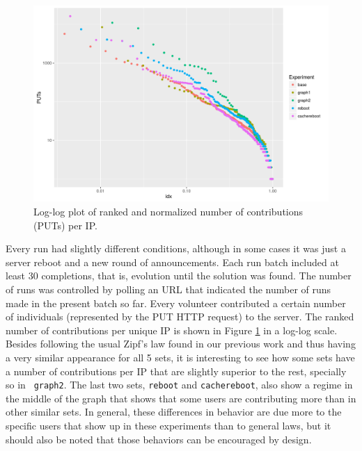 \documentclass[runningheads,a4paper]{llncs}\usepackage[]{graphicx}\usepackage[]{color}
\makeatletter
\def\maxwidth{ %
  \ifdim\Gin@nat@width>\linewidth
    \linewidth
  \else
    \Gin@nat@width
  \fi
}
\newenvironment{knitrout}{}{} %
\makeatother
\begin{document}
%
%
\begin{figure}[htbp]
\centering
\begin{knitrout}
\color{fgcolor}
\includegraphics[width=\maxwidth]{figure/zipf-1} 

\end{knitrout}
%
\caption{Log-log plot of ranked and normalized number of contributions (PUTs) per IP.\label{fig:zipf}}
\end{figure}
%
Every run had slightly different conditions, although in some cases it
was just a server reboot and a new round of announcements. Each run
batch included at least 30 completions, that is, evolution until the
solution was found. The number of runs was controlled by polling an
URL that indicated the number of runs made in the present batch so
far. Every volunteer contributed a certain number of individuals
(represented by the PUT HTTP request) to the server. The ranked number
of contributions per unique IP is shown in Figure \ref{fig:zipf} in a
log-log scale. Besides following the usual Zipf's law found in our
previous work and thus having a very similar appearance for all 5 sets, it
is interesting to see how some sets have a number of contributions per
IP that are slightly superior to the rest, specially so in {\tt
  graph2}. The last two sets, {\tt reboot} and {\tt cachereboot}, also
show a regime in the middle of the graph that shows that some users
are contributing more than in other similar sets. In general, these
differences in behavior are due more to the specific users that show
up in these experiments than to general laws, but it should also be
noted that those behaviors can be encouraged by design.
\end{document}
